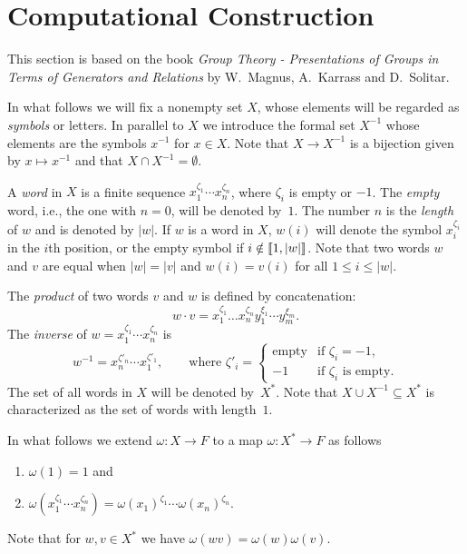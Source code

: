 \section{Computational Construction}
\setcounter{subsection}{1}

This section is based on the book \textit{Group Theory - Presentations of Groups in Terms of Generators and Relations\/} by W.~Magnus, A.~Karrass and D.~Solitar.

In what follows we will fix a nonempty set $X$, whose elements will be regarded as \textsl{symbols} or letters. In parallel to $X$ we introduce the formal set $X^{-1}$ whose elements are the symbols $x^{-1}$ for $x\in X$. Note that $X\to X^{-1}$ is a bijection given by $x\mapsto x^{-1}$ and that $X\cap X^{-1}=\emptyset$.

\begin{defns}\label{defns:words}
    A \textsl{word} in\/ $X$ is a finite sequence\/ $x_1^{\zeta_1}\cdots x_n^{\zeta_n}$, where\/ $\zeta_i$ is empty or\/ $-1$. The \textsl{empty} word, i.e., the one with\/ $n=0$, will be denoted by\/~$1$. The number $n$ is the \textsl{length} of $w$ and is denoted by $|w|$. If $w$ is a word in $X$, $w(i)$ will denote the symbol $x_i^{\zeta_i}$ in the $i$th position, or the empty symbol if $i\notin\llbracket1,|w|\rrbracket$. Note that two words $w$ and $v$ are equal when $|w|=|v|$ and $w(i)=v(i)$ for all $1\le i\le|w|$.

    The \textsl{product} of two words $v$ and $w$ is defined by concatenation:
    $$
        w\cdot v=x_1^{\zeta_1}\dots x_n^{\zeta_n}
    y_1^{\xi_1}\cdots y_m^{\xi_m}.
    $$
    The \textsl{inverse} of $w=x_1^{\zeta_1}\cdots x_n^{\zeta_n}$ is
    $$
        w^{-1} = x_n^{\zeta'_n}\cdots x_1^{\zeta'_1},
        \qquad\text{where }\zeta'_i=\begin{cases}
                \text{empty}    &\text{if }\zeta_i=-1,\\
                -1 &\text{if $\zeta_i$ is empty}.
            \end{cases}
    $$
    The set of all words in $X$ will be denoted by~$X^*$. Note that $X\cup X^{-1}\subseteq X^*$ is characterized as the set of words with length~$1$.
\end{defns}

\begin{ntn}
    In what follows we extend $\omega\colon X\to F$ to a map $\omega\colon X^*\to F$ as follows
    \begin{enumerate}[-]
        \item $\omega(1)=1$ and
        \item $\omega(x_1^{\zeta_1}\cdots x_n^{\zeta_n})
            =\omega(x_1)^{\zeta_1}\cdots\omega(x_n)^{\zeta_n}$. 
    \end{enumerate}
    Note that for $w,v\in X^*$ we have $\omega(wv)=\omega(w)\omega(v)$.
\end{ntn}

